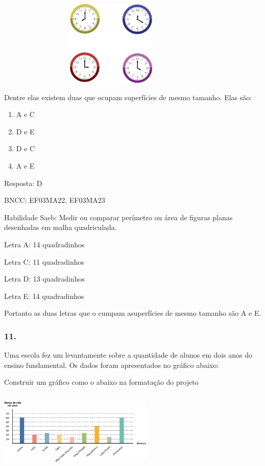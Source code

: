 \includegraphics[width=4.36538in,height=1.60417in]{media/image111.png}

Dentre elas existem duas que ocupam superfícies de mesmo tamanho. Elas
são:

\begin{enumerate}
\def\labelenumi{\alph{enumi})}
\item
  A e C
\item
  D e E
\item
  D e C
\item
  A e E
\end{enumerate}

Resposta: D

BNCC: EF03MA22, EF03MA23

Habilidade Saeb: Medir ou comparar perímetro ou área de figuras planas
desenhadas em malha quadriculada.

Letra A: 14 quadradinhos

Letra C: 11 quadradinhos

Letra D: 13 quadradinhos

Letra E: 14 quadradinhos

Portanto as duas letras que o cumpam asuperfícies de mesmo tamanho são A
e E.

\subsubsection{11. }\label{section-136}

Uma escola fez um levantamente sobre a quantidade de alunos em dois anos
do ensino fundamental. Os dados foram apresentados no gráfico abaixo:

Construir um gráfico como o abaixo na formatação do projeto

\includegraphics[width=2.89744in,height=1.52156in]{media/image112.png}

